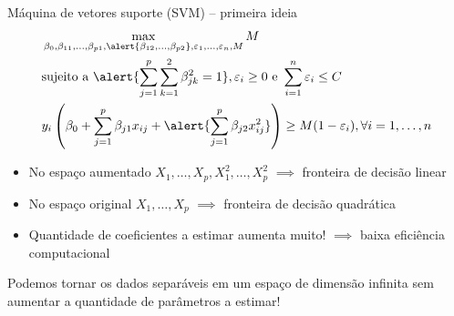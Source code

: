 \begin{frame}{Máquina de vetores suporte (SVM) -- primeira ideia}
    \vspace{-0.7cm}
    \begin{align*}
        &\max_{\beta_0, \beta_{11}, \dots, \beta_{p1}, \alert{\beta_{12}, \dots, \beta_{p2}}, \varepsilon_1, \dots, \varepsilon_n, M} M \\ 
        &\text{sujeito a }\alert{\sum_{j = 1}^{p}\sum_{k = 1}^{2} \beta_{jk}^2 = 1}, \varepsilon_i \geq 0 \text{ e } \sum_{i = 1}^{n} \varepsilon_i \leq C \\
        &y_i\left(\beta_0 + \sum_{j = 1}^{p} \beta_{j1} x_{ij} + \alert{\sum_{j = 1}^{p} \beta_{j2} x_{ij}^2}\right) \geq M(1 - \varepsilon_i), \forall i = 1, \dots, n
    \end{align*}
    
    \pause
    
    \begin{itemize}
        \item No espaço aumentado $X_1, \dots, X_p, X_1^2, \dots, X_p^2$ $\implies$ fronteira de decisão linear
        
        \pause
        
        \item No espaço original $X_1, \dots, X_p$ $\implies$ fronteira de decisão quadrática
        
        \pause
        
        \item Quantidade de coeficientes a estimar aumenta muito! $\implies$ baixa eficiência computacional
    \end{itemize}
    
    \pause
    
    \begin{center}
        Podemos tornar os dados separáveis em um espaço de dimensão infinita sem aumentar a quantidade de parâmetros a estimar!
    \end{center}
\end{frame}



